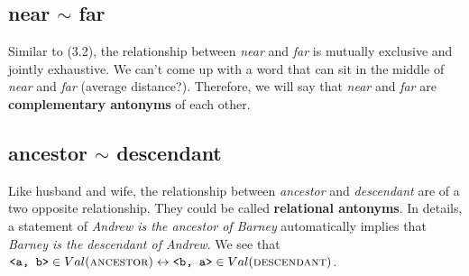 \documentclass{article}
\begin{document}
\subsection{near $\sim$ far}
Similar to (3.2), the relationship between \textit{near} and \textit{far} is mutually exclusive and jointly exhaustive. We can't come up with a word that can sit in the middle of \textit{near} and \textit{far} (average distance?). Therefore, we will say that \textit{near} and \textit{far} are \textbf{complementary antonyms} of each other.

\subsection{ancestor $\sim$ descendant}
Like husband and wife, the relationship between \textit{ancestor} and \textit{descendant} are of a two opposite relationship. They could be called \textbf{relational antonyms}. In details, a statement of \textit{Andrew is the ancestor of Barney} automatically implies that \textit{Barney is the descendant of Andrew}. We see that $\verb|<a, b>| \in Val(\textsc{ancestor}) \leftrightarrow \verb|<b, a>| \in Val(\textsc{descendant})$. 
\end{document}
